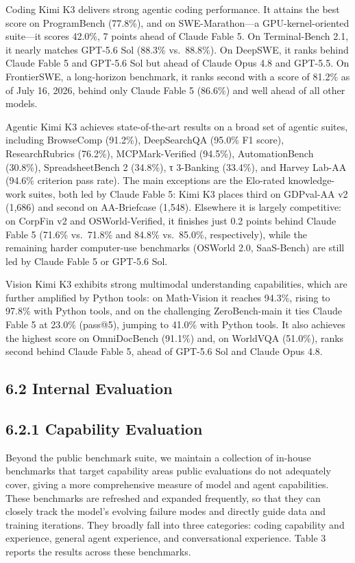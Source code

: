 \documentclass[
  10
]{article}
\begin{document}
Coding Kimi K3 delivers strong agentic coding performance. It attains
the best score on ProgramBench (77.8\%), and on SWE-Marathon---a
GPU-kernel-oriented suite---it scores 42.0\%, 7 points ahead of Claude
Fable 5. On Terminal-Bench 2.1, it nearly matches GPT-5.6 Sol (88.3\%
vs.~88.8\%). On DeepSWE, it ranks behind Claude Fable 5 and GPT-5.6 Sol
but ahead of Claude Opus 4.8 and GPT-5.5. On FrontierSWE, a long-horizon
benchmark, it ranks second with a score of 81.2\% as of July 16, 2026,
behind only Claude Fable 5 (86.6\%) and well ahead of all other models.

Agentic Kimi K3 achieves state-of-the-art results on a broad set of
agentic suites, including BrowseComp (91.2\%), DeepSearchQA (95.0\% F1
score), ResearchRubrics (76.2\%), MCPMark-Verified (94.5\%),
AutomationBench (30.8\%), SpreadsheetBench 2 (34.8\%), τ 3-Banking
(33.4\%), and Harvey Lab-AA (94.6\% criterion pass rate). The main
exceptions are the Elo-rated knowledge-work suites, both led by Claude
Fable 5: Kimi K3 places third on GDPval-AA v2 (1,686) and second on
AA-Briefcase (1,548). Elsewhere it is largely competitive: on CorpFin v2
and OSWorld-Verified, it finishes just 0.2 points behind Claude Fable 5
(71.6\% vs.~71.8\% and 84.8\% vs.~85.0\%, respectively), while the
remaining harder computer-use benchmarks (OSWorld 2.0, SaaS-Bench) are
still led by Claude Fable 5 or GPT-5.6 Sol.

Vision Kimi K3 exhibits strong multimodal understanding capabilities,
which are further amplified by Python tools: on Math-Vision it reaches
94.3\%, rising to 97.8\% with Python tools, and on the challenging
ZeroBench-main it ties Claude Fable 5 at 23.0\% (pass@5), jumping to
41.0\% with Python tools. It also achieves the highest score on
OmniDocBench (91.1\%) and, on WorldVQA (51.0\%), ranks second behind
Claude Fable 5, ahead of GPT-5.6 Sol and Claude Opus 4.8.

\subsection{6.2 Internal Evaluation}\label{internal-evaluation}

\subsection{6.2.1 Capability Evaluation}\label{capability-evaluation}

Beyond the public benchmark suite, we maintain a collection of in-house
benchmarks that target capability areas public evaluations do not
adequately cover, giving a more comprehensive measure of model and agent
capabilities. These benchmarks are refreshed and expanded frequently, so
that they can closely track the model's evolving failure modes and
directly guide data and training iterations. They broadly fall into
three categories: coding capability and experience, general agent
experience, and conversational experience. Table 3 reports the results
across these benchmarks.
\end{document}
